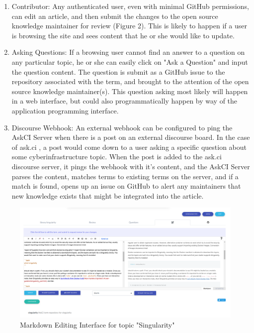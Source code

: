 \documentclass{jors}
\begin{document}
\begin{enumerate}
\item Contributor: Any authenticated user, even with minimal GitHub permissions, can edit an article, and then submit the changes to the open source knowledge maintainer for review (Figure 2). This is likely to happen if a user is browsing the site and sees content that he or she would like to update.
\item Asking Questions: If a browsing user cannot find an answer to a question on any particular topic, he or she can easily click on "Ask a Question" and input the question content. The question is submit as a GitHub issue to the repository associated with the term, and brought to the attention of the open source knowledge maintainer(s). This question asking most likely will happen in a web interface, but could also programmatically happen by way of the application programming interface.
\item Discourse Webhook: An external webhook can be configured to ping the AskCI Server when there is a post on an external discourse board. In the case of ask.ci \cite{askci}, a post would come down to a user asking a specific question about some cyberinfrastructure topic. When the post is added to the ask.ci discourse server, it pings the webhook with it's content, and the AskCI Server parses the content, matches terms to existing terms on the server, and if a match is found, opens up an issue on GitHub to alert any maintainers that new knowledge exists that might be integrated into the article.
\end{enumerate}

\begin{figure}[h]
\caption{Markdown Editing Interface for topic "Singularity"}
\centering
\includegraphics[width=1.0\textwidth]{figure2.png}
\end{figure}
\end{document}

